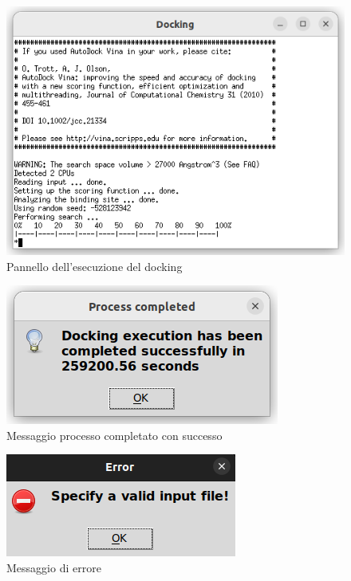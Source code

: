 \begin{figure}[H]
    \centering
    \includegraphics[scale=0.8]{immagini/capitolo3/dockingExecution.png}
    \caption{Pannello dell'esecuzione del docking}
    \label{fig:docking execution}
\end{figure}

\begin{figure}[H]
    \centering
    \includegraphics{immagini/capitolo3/progressCompletedDocking.png}
    \caption{Messaggio processo completato con successo}
    \label{fig:progress completed docking}
\end{figure}

\begin{figure}[H]
    \centering
    \includegraphics{immagini/capitolo3/invalidInputDocking.png}
    \caption{Messaggio di errore}
    \label{fig:invalid input docking}
\end{figure}


